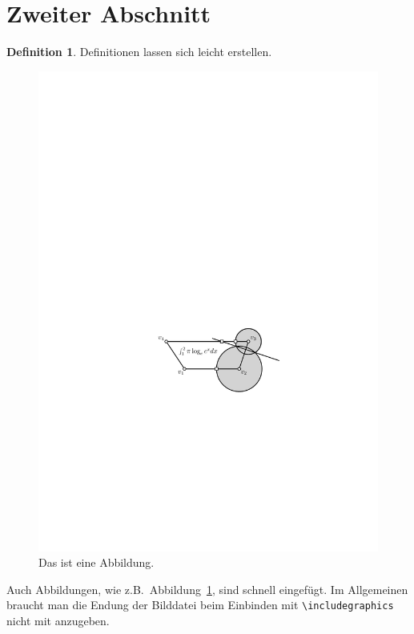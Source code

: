 \documentclass[a4paper]{scrreprt}
\theoremstyle{definition}
\newtheorem{definition}[satz]{Definition}
\begin{document}
\section{Zweiter Abschnitt}
\label{sec:leichtigkeit}

\begin{definition}
  Definitionen lassen sich leicht erstellen.
\end{definition}

\begin{figure}[h]
  \centering
  \includegraphics{trapez}
  \caption{Das ist eine Abbildung.}
  \label{fig:trapez}
\end{figure}

Auch Abbildungen, wie z.B.\ Abbildung~\ref{fig:trapez}, sind schnell
eingefügt.  Im Allgemeinen braucht man die Endung der Bilddatei beim
Einbinden mit \verb+\includegraphics+ nicht mit anzugeben.
\end{document}
